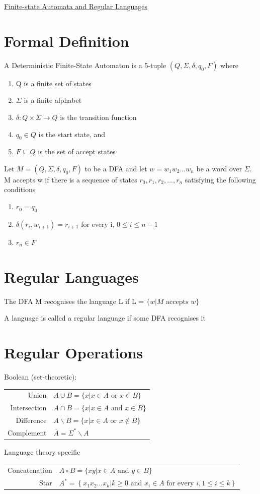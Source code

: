\documentclass{article}[18pt]
\begin{document}
\begin{center}
\underline{\huge Finite-state Automata and Regular Languages}
\end{center}
\section{Formal Definition}
A Deterministic Finite-State Automaton is a 5-tuple $(Q,\Sigma, \delta, q_0,F)$ where
\begin{enumerate}
	\item Q is a finite set of states
	\item $\Sigma$ is a finite alphabet
	\item $\delta: Q\times \Sigma \rightarrow Q$ is the transition function
	\item $q_0\in Q$ is the start state, and
	\item $F\subseteq Q$ is the set of accept states
\end{enumerate}
Let $M=(Q,\Sigma, \delta, q_0,F)$ to be a DFA and let $w=w_1w_2...w_n$ be a word over $\Sigma$. M accepts w if there is a sequence of states $r_0,r_1,r_2,...,r_n$ satisfying the following conditions
\begin{enumerate}
	\item $r_0=q_0$
	\item $\delta(r_i,w_{i+1})=r_{i+1}$ for every i, $0\leqslant i\leqslant n-1$
	\item $r_n\in F$
\end{enumerate}
\section{Regular Languages}
The DFA M recognises the language L if L = $\{w| M \text{ accepts } w\}$
\begin{definition}
	A language is called a regular language if some DFA recognises it
\end{definition}
\section{Regular Operations}
Boolean (set-theoretic):\\
\begin{tabularx}{\textwidth}{r l}
Union& $A\cup B=\{x| x\in A \text{ or } x\in B\}$\\
Intersection& $A\cap B=\{x| x\in A \text{ and } x\in B\}$\\
Difference& $A\backslash B=\{x| x\in A \text{ or } x\notin B\}$\\
Complement& $\overline{A}=\Sigma^* \backslash A$
\end{tabularx}
Language theory specific\\
\begin{tabularx}{\textwidth}{r l}
Concatenation& $A\circ B = \{xy| x\in A \text{ and } y\in B\}$\\
Star& \(A^{*}=\left\{x_{1} x_{2} \ldots x_{k} | k \geq 0 \text { and } x_{i} \in A \text { for every } i, 1 \leq i \leq k\right\}\)
\end{tabularx}
\end{document}
